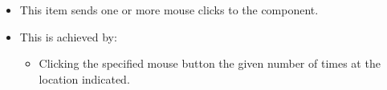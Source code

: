 
\begin{itemize}
\item This item sends one or more mouse clicks to the component.
\item This is achieved by:
\begin{itemize}
\item Clicking the specified mouse button the given number of times at the location indicated.
\end{itemize}
\end{itemize}
